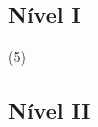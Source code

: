 \documentclass[braun, twocolumn]{braun}
\begin{document}
\subsection{Nível I}


\begin{checks}
(5)
\item {}
\item {}
\item {}
\item {}
\item {}
\item {}
\item {}
\item {}
\item {}
\item {}
\item {}
\item {}
\item {}
\item {}
\item {}
\item {}
\item {}
\item {}
\item {}
\item {}
\item {}
\item {}
\item {}
\item {}
\item {}
\item {}
\item {}
\item {}
\end{checks}
\subsection{Nível II}
\end{document}
